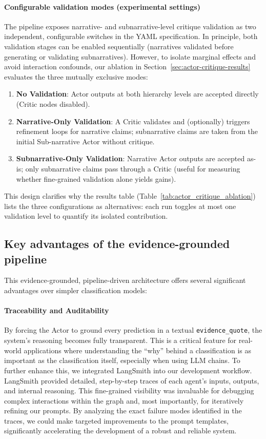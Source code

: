 \paragraph{Configurable validation modes (experimental settings)}\label{par:validation-modes}
The pipeline exposes narrative- and subnarrative-level critique validation as two independent, configurable switches in the YAML specification. In principle, both validation stages can be enabled sequentially (narratives validated before generating or validating subnarratives). However, to isolate marginal effects and avoid interaction confounds, our ablation in Section~\ref{sec:actor-critique-results} evaluates the three mutually exclusive modes:
\begin{enumerate}
  \item \textbf{No Validation}: Actor outputs at both hierarchy levels are accepted directly (Critic nodes disabled).
  \item \textbf{Narrative-Only Validation}: A Critic validates and (optionally) triggers refinement loops for narrative claims; subnarrative claims are taken from the initial Sub-narrative Actor without critique.
  \item \textbf{Subnarrative-Only Validation}: Narrative Actor outputs are accepted as-is; only subnarrative claims pass through a Critic (useful for measuring whether fine-grained validation alone yields gains).
\end{enumerate}
This design clarifies why the results table (Table~\ref{tab:actor_critique_ablation}) lists the three configurations as alternatives: each run toggles at most one validation level to quantify its isolated contribution.

\subsection{Key advantages of the evidence-grounded pipeline}

This evidence-grounded, pipeline-driven architecture offers several significant advantages over simpler classification models:

\paragraph{Traceability and Auditability}
By forcing the Actor to ground every prediction in a textual \texttt{evidence\_quote}, the system's reasoning becomes fully transparent. This is a critical feature for real-world applications where understanding the ``why'' behind a classification is as important as the classification itself, especially when using LLM chains. To further enhance this, we integrated LangSmith \cite{langsmith2024} into our development workflow. LangSmith provided detailed, step-by-step traces of each agent's inputs, outputs, and internal reasoning. This fine-grained visibility was invaluable for debugging complex interactions within the graph and, most importantly, for iteratively refining our prompts. By analyzing the exact failure modes identified in the traces, we could make targeted improvements to the prompt templates, significantly accelerating the development of a robust and reliable system.

